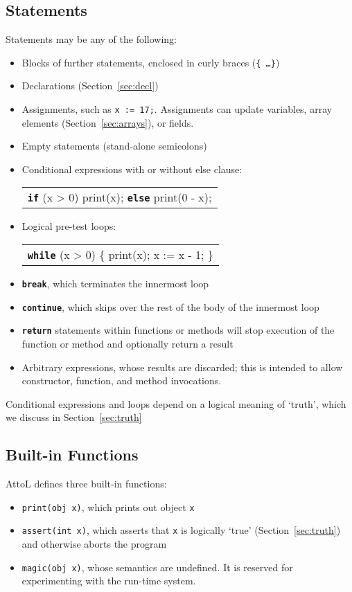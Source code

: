 \documentclass[11pt,a4paper]{article}
\newenvironment{slisting}{%
        \begin{tt}%
        \begin{tabular}{l}%
        }
        {%
        \end{tabular}%
        \end{tt}%
        }
\newcommand{\Cty}[1]{\textcolor{dblue}{\texttt{#1}}}
\newcommand{\Ckw}[1]{\textbf{\texttt{#1}}}
\begin{document}
\subsection{Statements}
Statements may be any of the following:
\begin{itemize}
\item Blocks of further statements, enclosed in curly braces (\texttt{\{ \ldots \}})
\item Declarations (Section~\ref{sec:decl})
\item Assignments, such as \texttt{x := 17;}.  Assignments can update variables,
  array elements (Section~\ref{sec:arrays}), or fields.
\item Empty statements (stand-alone semicolons)
\item Conditional expressions with or without else clause:
  \begin{slisting}
    \Ckw{if} (x > 0) print(x); \Ckw{else} print(0 - x);\\
  \end{slisting}
\item Logical pre-test loops:
    \begin{slisting}
      \Ckw{while} (x > 0) \{ print(x); x := x - 1; \}
    \end{slisting}
\item \Ckw{break}, which terminates the innermost loop
\item \Ckw{continue}, which skips over the rest of the body of the innermost loop
\item \Ckw{return} statements within functions or methods will stop execution of the function or method and optionally return a result
\item Arbitrary expressions, whose results are discarded; this is intended to allow constructor, function, and method invocations.
\end{itemize}
Conditional expressions and loops depend on a logical meaning of `truth', which we discuss in Section~\ref{sec:truth}

\subsection{Built-in Functions}
AttoL defines three built-in functions:
\begin{itemize}
\item \texttt{print(\Cty{obj} x)}, which prints out object \texttt{x}
\item \texttt{assert(\Cty{int} x)}, which asserts that \texttt{x} is logically `true' (Section~\ref{sec:truth}) and otherwise aborts the program
\item \texttt{magic(\Cty{obj} x)}, whose semantics are undefined.  It is reserved for experimenting with the run-time system.
\end{itemize}
\end{document}
